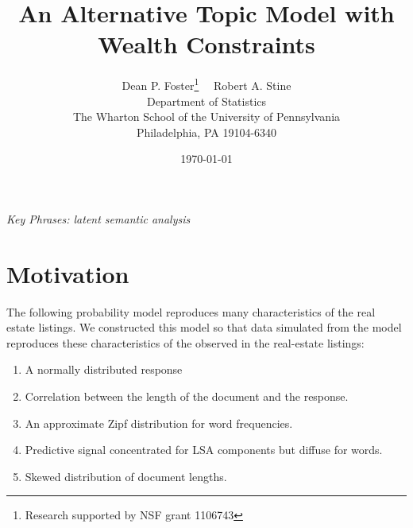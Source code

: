\documentclass[12pt]{article}
\title{ An Alternative Topic Model with Wealth Constraints }
\author{
        Dean P. Foster\footnote{Research supported by NSF grant 1106743} 
        \ \ Robert A. Stine\footnotemark[\value{footnote}]   \\
        Department of Statistics                             \\
        The Wharton School of the University of Pennsylvania \\
        Philadelphia, PA 19104-6340                          
}
\date{\today}
\begin{document}
\vspace{-0.5in}
\maketitle 
\vspace{-.5in}

\vspace{0.15in}

\noindent
{\it Key Phrases:  latent semantic analysis} 

\clearpage

\section{Motivation}
\label{sec:motivation}



The following probability model reproduces many characteristics of the real estate listings.   We constructed this model so that data simulated from the model  reproduces these characteristics of the observed in the real-estate listings:
\begin{enumerate}
 \item  A normally distributed response 
  \item Correlation between the length of the document and the response.
 \item An approximate Zipf distribution for word frequencies.
  \item Predictive signal concentrated for LSA components but diffuse for words.
  \item Skewed distribution of document lengths.
\end{enumerate}
\end{document}
